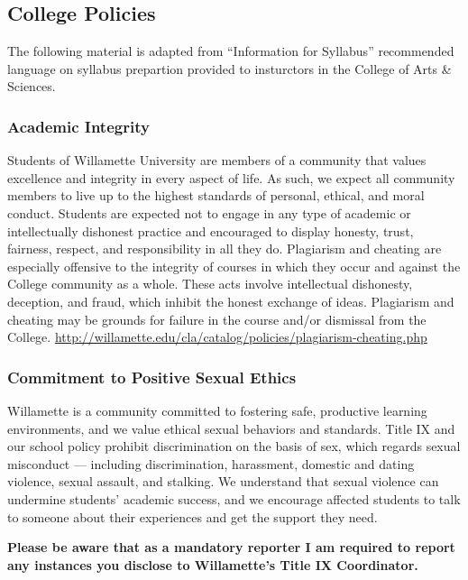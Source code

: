 \subsection*{College Policies}

The following material is adapted from ``Information for Syllabus'' recommended language on syllabus prepartion provided to insturctors in the College of Arts \& Sciences.

\subsubsection*{Academic Integrity}

Students of Willamette University are members of a community that values excellence and integrity in every aspect of life. As such, we expect all community members to live up to the highest standards of personal, ethical, and moral conduct. Students are expected not to engage in any type of academic or intellectually dishonest practice and encouraged to display honesty, trust, fairness, respect, and responsibility in all they do. Plagiarism and cheating are especially offensive to the integrity of courses in which they occur and against the College community as a whole. These acts involve intellectual dishonesty, deception, and fraud, which inhibit the honest exchange of ideas. Plagiarism and cheating may be grounds for failure in the course and/or dismissal from the College. \url{http://willamette.edu/cla/catalog/policies/plagiarism-cheating.php}

\subsubsection*{Commitment to Positive Sexual Ethics}

Willamette is a community committed to fostering safe, productive learning environments, and we value ethical sexual behaviors and standards. Title IX and our school policy prohibit discrimination on the basis of sex, which regards sexual misconduct — including discrimination, harassment, domestic and dating violence, sexual assault, and stalking. We understand that sexual violence can undermine students’ academic success, and we encourage affected students to talk to someone about their experiences and get the support they need. 

\begin{quoting}\textbf{Please be aware that as a mandatory reporter I am required to report any instances you disclose to Willamette's Title IX Coordinator.}\end{quoting}

